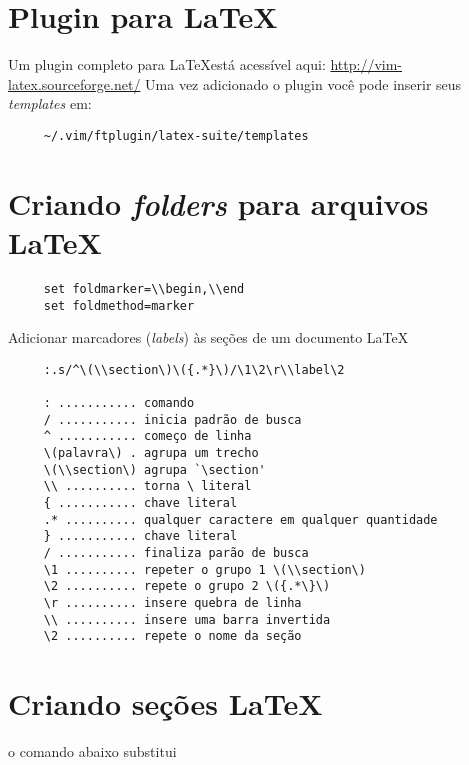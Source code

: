 \section{Plugin para \LaTeX}
\label{Plugin para LaTeX}
Um plugin completo para \LaTeX está acessível aqui: \url{http://vim-latex.sourceforge.net/}
Uma vez adicionado o plugin você pode inserir seus {\em templates}
em:

\begin{verbatim}
     ~/.vim/ftplugin/latex-suite/templates
\end{verbatim}


\section{Criando {\em folders} para arquivos \LaTeX}
\label{Criando folders para arquivos LaTeX}

\begin{verbatim}
     set foldmarker=\\begin,\\end
     set foldmethod=marker
\end{verbatim}

Adicionar marcadores ({\em labels}) às seções de um documento \LaTeX
\begin{verbatim}
     :.s/^\(\\section\)\({.*}\)/\1\2\r\\label\2
     
     : ........... comando
     / ........... inicia padrão de busca
     ^ ........... começo de linha
     \(palavra\) . agrupa um trecho
     \(\\section\) agrupa `\section'
     \\ .......... torna \ literal
     { ........... chave literal
     .* .......... qualquer caractere em qualquer quantidade
     } ........... chave literal
     / ........... finaliza parão de busca
     \1 .......... repeter o grupo 1 \(\\section\) 
     \2 .......... repete o grupo 2 \({.*\}\)
     \r .......... insere quebra de linha
     \\ .......... insere uma barra invertida
     \2 .......... repete o nome da seção
\end{verbatim}

\section{Criando seções \LaTeX}\label{Criando seções latex}
o comando abaixo substitui

